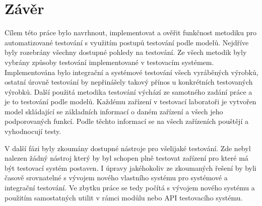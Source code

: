 \chapter{Závěr}
Cílem této práce bylo navrhnout, implementovat a ověřit funkčnost metodiku pro automatizované testování s využitím postupů testování podle modelů. Nejdříve byly rozebrány všechny dostupné pohledy na testování. Ze všech metodik byly vybrány způsoby testování implementované v testovacím systémem. Implementována bylo integrační a systémové testování všech vyráběných výrobků, ostatní úrovně testování by nepřinášely takový přínos u konkrétních testovaných výrobků. Další použitá metodika testování výchází ze samotného zadání práce a je to testování podle modelů. Každému zařízení v testovací laboratoři je vytvořen model skládající se základních informací o daném zařízení a všech jeho podporovaných funkcí. Podle těchto informací se na všech zařízeních pouštějí a vyhodnocují testy.

V další fázi byly zkoumány dostupné nástroje pro všelijaké testování. Zde nebyl nalezen žádný nástroj který by byl schopen plně testovat zařízení pro které má být testovací systém postaven. I úpravy jakéhokoliv ze zkoumaných řešení by byli časově srovnatelné s vývojem nového vlastního systému pro systémové a integrační testování. Ve zbytku práce se tedy počítá s vývojem nového systému a použitím samostatných utilit v rámci modůlu nebo API testovacího systému.



\endinput
